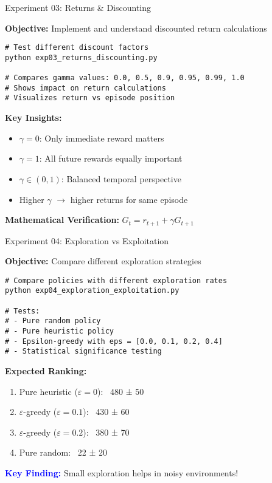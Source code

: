 \documentclass[aspectratio=169,10pt]{beamer}
\begin{document}
\begin{frame}[fragile]{Experiment 03: Returns \& Discounting}

\textbf{Objective:} Implement and understand discounted return calculations

\begin{lstlisting}
# Test different discount factors
python exp03_returns_discounting.py

# Compares gamma values: 0.0, 0.5, 0.9, 0.95, 0.99, 1.0
# Shows impact on return calculations
# Visualizes return vs episode position
\end{lstlisting}

\vfill

\textbf{Key Insights:}
\begin{itemize}
    \item $\gamma = 0$: Only immediate reward matters
    \item $\gamma = 1$: All future rewards equally important
    \item $\gamma \in (0,1)$: Balanced temporal perspective
    \item Higher $\gamma$ $\rightarrow$ higher returns for same episode
\end{itemize}

\vfill

\textbf{Mathematical Verification:} $G_t = r_{t+1} + \gamma G_{t+1}$

\end{frame}

\begin{frame}[fragile]{Experiment 04: Exploration vs Exploitation}

\textbf{Objective:} Compare different exploration strategies

\begin{lstlisting}
# Compare policies with different exploration rates
python exp04_exploration_exploitation.py

# Tests:
# - Pure random policy
# - Pure heuristic policy  
# - Epsilon-greedy with eps = [0.0, 0.1, 0.2, 0.4]
# - Statistical significance testing
\end{lstlisting}

\vfill

\textbf{Expected Ranking:}
\begin{enumerate}
    \item Pure heuristic ($\varepsilon = 0$): ~480 ± 50
    \item $\varepsilon$-greedy ($\varepsilon = 0.1$): ~430 ± 60  
    \item $\varepsilon$-greedy ($\varepsilon = 0.2$): ~380 ± 70
    \item Pure random: ~22 ± 20
\end{enumerate}

\vfill

\textcolor{blue}{\textbf{Key Finding:}} Small exploration helps in noisy environments!

\end{frame}
\end{document}
